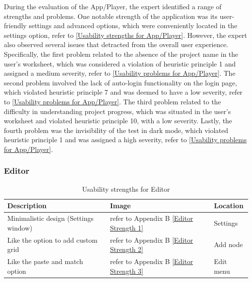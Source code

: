 \documentclass[conference,onecolumn]{IEEEtran}
\begin{document}
            During the evaluation of the App/Player, the expert identified a range of strengths and problems. One notable strength of the application was its user-friendly settings and advanced options, which were conveniently located in the settings option, refer to \tablename{ \ref{Usability strengths for App/Player}}. However, the expert also observed several issues that detracted from the overall user experience. Specifically, the first problem related to the absence of the project name in the user's worksheet, which was considered a violation of heuristic principle 1 and assigned a medium severity, refer to \tablename{ \ref{Usability problems for App/Player}}. The second problem involved the lack of auto-login functionality on the login page, which violated heuristic principle 7 and was deemed to have a low severity, refer to \tablename{ \ref{Usability problems for App/Player}}. The third problem related to the difficulty in understanding project progress, which was situated in the user's worksheet and violated heuristic principle 10, with a low severity. Lastly, the fourth problem was the invisibility of the test in dark mode, which violated heuristic principle 1 and was assigned a high severity, refer to \tablename{ \ref{Usability problems for App/Player}}.

        \subsubsection{Editor}\hfill

            \begin{table}[H]	
                \begin{center}
                    \begin{tabular}[H]{ |m{8cm}|m{5cm}|m{4cm}|}
                        \hline
                        \textbf{Description}&\textbf{Image} &\textbf{Location}  \\ \hline
                        Minimalistic design (Settings window) 	&refer to Appendix B \figurename{\ref{Editor Strength 1}} &Settings  \\ \hline
                        Like the option to add custom grid 	    &refer to Appendix B \figurename{\ref{Editor Strength 2}} &Add node  \\ \hline
                        Like the paste and match option      	&refer to Appendix B \figurename{\ref{Editor Strength 3}} &Edit menu  \\ 
                        \hline
                    \end{tabular}
                \end{center}
                \caption{Usability strengths for Editor}
                \label{Usability strengths for Editor}
            \end{table}
            
\end{document}

